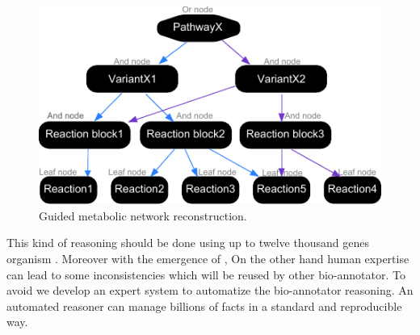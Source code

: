 \documentclass{llncs}
\begin{document}
\begin{figure}[H]
    \centering
    \includegraphics{img/pathway.pdf}
    \caption{Guided metabolic network reconstruction.}
    \label{fig:metabolicNetworkReconstruction}
\end{figure}

This kind of reasoning should  be done using up to twelve thousand genes  organism \cite{dagan2013genomes}. Moreover with the emergence of ,  On the other hand\added{,} human expertise can lead to some inconsistencies which will be reused by other bio-annotator. To avoid  we develop an expert system to automatize the bio-annotator reasoning. An automated reasoner can manage billions of facts in a standard and reproducible way.
\end{document}
